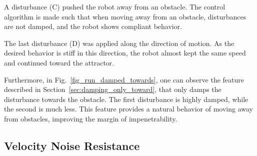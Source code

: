 A disturbance (C) pushed the robot away from an obstacle. The control algorithm is made such that when moving away from an obstacle, disturbances are not damped, and the robot shows compliant behavior. 

The last disturbance (D) was applied along the direction of motion. As the desired behavior is stiff in this direction, the robot almost kept the same speed and continued toward the attractor.


Furthermore, in Fig.~\ref{fig_run_damped_towards}, one can observe the feature described in Section~\ref{sec:damping_only_toward}, that only damps the disturbance towards the obstacle.
The first disturbance is highly damped, while the second is much less. This feature provides a natural behavior of moving away from obstacles, improving the margin of impenetrability. 

\subsection{Velocity Noise Resistance}

